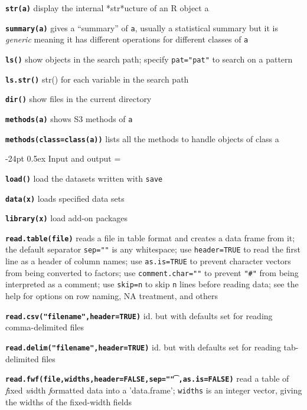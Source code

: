 \documentclass[10pt,landscape]{article}
\makeatletter
\renewcommand\section{\@startsection{section}{1}{0mm}%
                                     {-24pt}%
                                     {0.5ex}%
                                {\color{blue}\normalfont\large\bfseries}}
\newcommand{\code}{\texttt}
\newcommand{\bcode}[1]{\texttt{\textbf{#1}}}
\makeatother
\begin{document}
\begin{multicols*}{3}
\bcode{str(a)} display the internal *str*ucture of an R object a

\bcode{summary(a)} gives a ``summary'' of \code{a}, usually a
statistical summary but it is \emph{generic} meaning it has different operations for different
classes of \code{a}

\bcode{ls()} show objects in the search path; specify \code{pat="pat"}
to search on a pattern

\bcode{ls.str()} str() for each variable in the search path

\bcode{dir()} show files in the current directory

\bcode{methods(a)} shows S3 methods of \code{a}

\bcode{methods(class=class(a))} lists all the methods to handle objects
of class a

\section{Input and output}
\everypar={\hangindent=9mm}

\bcode{load()} load the datasets written with \code{save}

\bcode{data(x)} loads specified data sets

\bcode{library(x)} load add-on packages

\bcode{read.table(file)} reads a file in table format and
                creates a data frame from it; the default separator
                \code{sep=""} is any whitespace; use \code{header=TRUE}
                to read the first line as a header of column names; use \code{as.is=TRUE} to
                prevent character vectors from being converted to
                factors; use \code{comment.char=""} to prevent
                \code{"\#"} from being interpreted as a comment; use
                \code{skip=n} to skip \code{n} lines before reading data; see
                the help for options on row naming, NA treatment, and
                others

\bcode{read.csv("filename",header=TRUE)} id. but with defaults set for reading
comma-delimited files

\bcode{read.delim("filename",header=TRUE)} id. but with defaults set for reading
tab-delimited files

\bcode{read.fwf(file,widths,header=FALSE,sep="\t",as.is=FALSE)} read a table of \emph{f}ixed \emph{w}idth \emph{f}ormatted data into a
     'data.frame'; \code{widths} is an integer vector, giving the widths of the fixed-width fields


\end{multicols*}
\end{document}
